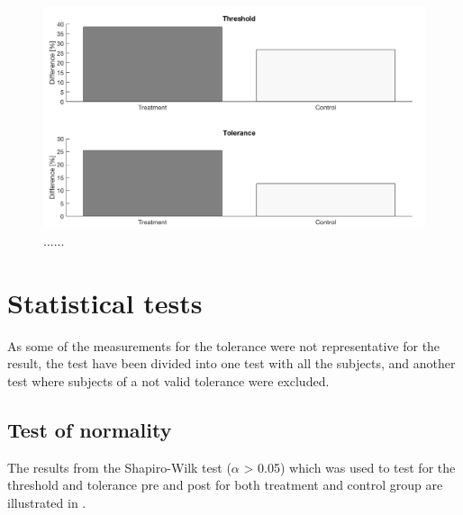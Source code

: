 \begin{figure}[H]
	\includegraphics[width=1\textwidth]{figures/barplot.png} 
	\caption{......}
	\label{fig:barplot}  
\end{figure}


\section{Statistical tests}
As some of the measurements for the tolerance were not representative for the result, the test have been divided into one test with all the subjects, and another test where subjects of a not valid tolerance were excluded.

\subsection{Test of normality}
The results from the Shapiro-Wilk test ($\alpha$ > 0.05) which was used to test for the threshold and tolerance pre and post for both treatment and control group are illustrated in .

